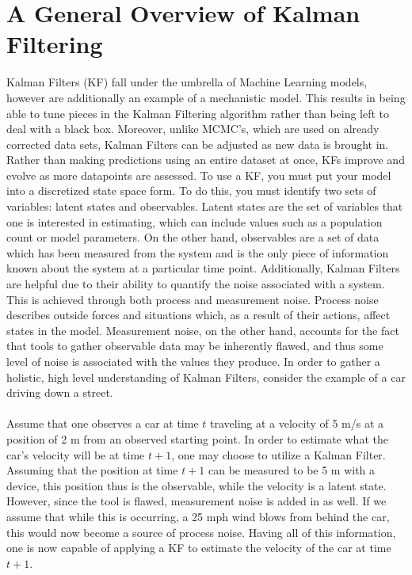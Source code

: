 \section{A General Overview of Kalman Filtering}
Kalman Filters (KF) fall under the umbrella of Machine Learning models, however are additionally an example of a mechanistic model. This results in being able to tune pieces in the Kalman Filtering algorithm rather than being left to deal with a black box. Moreover, unlike MCMC's, which are used on already corrected data sets, Kalman Filters can be adjusted as new data is brought in. Rather than making predictions using an entire dataset at once, KFs improve and evolve as more datapoints are assessed. To use a KF, you must put your model into a discretized state space form. To do this, you must identify two sets of variables: latent states and observables. Latent states are the set of variables that one is interested in estimating, which can include values such as a population count or model parameters. On the other hand, observables are a set of data which has been measured from the system and is the only piece of information known about the system at a particular time point. Additionally, Kalman Filters are helpful due to their ability to quantify the noise associated with a system. This is achieved through both process and measurement noise. Process noise describes outside forces and situations which, as a result of their actions, affect states in the model. Measurement noise, on the other hand, accounts for the fact that tools to gather observable data may be inherently flawed, and thus some level of noise is associated with the values they produce. In order to gather a holistic, high level understanding of Kalman Filters, consider the example of a car driving down a street.\\
\\
Assume that one observes a car at time $t$ traveling at a velocity of 5 m/s at a position of 2 m from an observed starting point. In order to estimate what the car's velocity will be at time $t+1$, one may choose to utilize a Kalman Filter. Assuming that the position at time $t+1$ can be measured to be 5 m with a device, this position thus is the observable, while the velocity is a latent state. However, since the tool is flawed, measurement noise is added in as well. If we assume that while this is occurring, a 25 mph wind blows from behind the car, this would now become a source of process noise. Having all of this information, one is now capable of applying a KF to estimate the velocity of the car at time $t+1$.\\
